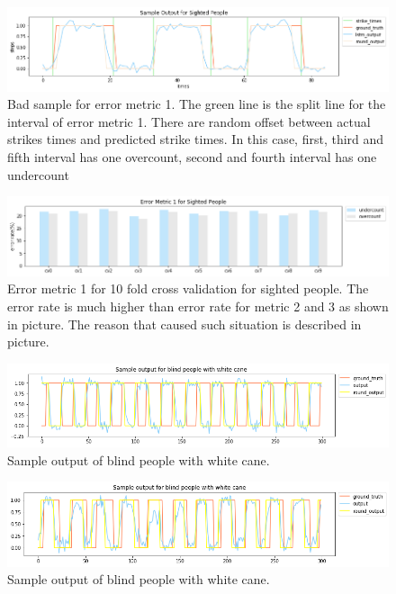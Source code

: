 \documentclass[11pt]{article}
\begin{document}
{\begin{figure}[ht]
\centering
\includegraphics[scale=0.5]{output_small_metric2}
\caption{Bad sample for error metric 1. The green line is the split line for the interval of error metric 1. There are random offset between actual strikes times and predicted strike times. In this case, first, third and fifth interval has one overcount, second and fourth interval has one undercount}
\label{fig:output_small_metric2}
\end{figure}




\begin{figure}[ht]
\centering
\includegraphics[scale=0.5]{error_metric_1_na_10fold}
\caption{Error metric 1 for 10 fold cross validation for sighted people. The error rate is much higher than error rate for metric 2 and 3 as shown in picture. The reason that caused such situation is described in picture.}
\label{fig:error_metric_1_na_10fold}
\end{figure}


\begin{figure}[ht]
\centering
\includegraphics[scale=0.5]{output_wc_1}
\caption{Sample output of blind people with white cane.}
\label{fig:output_wc_1}
\end{figure}

\begin{figure}[ht]
\centering
\includegraphics[scale=0.5]{output_wc_2}
\caption{Sample output of blind people with white cane.}
\label{fig:output_wc_2}
\end{figure}




}
\end{document}
